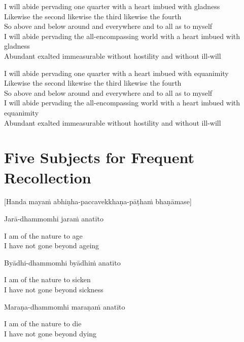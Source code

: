 I will abide pervading one quarter with a heart imbued with gladness\\
Likewise the second likewise the third likewise the fourth\\
So above and below around and everywhere and to all as to myself\\
I will abide pervading the all-encompassing world with a heart imbued with gladness\\
Abundant exalted immeasurable without hostility and without ill-will

I will abide pervading one quarter with a heart imbued with equanimity\\
Likewise the second likewise the third likewise the fourth\\
So above and below around and everywhere and to all as to myself\\
I will abide pervading the all-encompassing world with a heart imbued with equanimity\\
Abundant exalted immeasurable without hostility and without ill-will

\suttaRef{[DN 13]}

\clearpage

\section{Five Subjects for Frequent Recollection}
\label{five-recollections}

\begin{center}
  [Handa mayaṁ abhiṇha-paccavekkhaṇa-pāṭhaṁ bhaṇāmase]
\end{center}

Jarā-dhammomhi jaraṁ anatīto

\begin{english}
  I am of the nature to age\\
  I have not gone beyond ageing
\end{english}

Byādhi-dhammomhi byādhiṁ anatīto

\begin{english}
  I am of the nature to sicken\\
  I have not gone beyond sickness
\end{english}

Maraṇa-dhammomhi maraṇaṁ anatīto

\begin{english}
  I am of the nature to die\\
  I have not gone beyond dying
\end{english}

